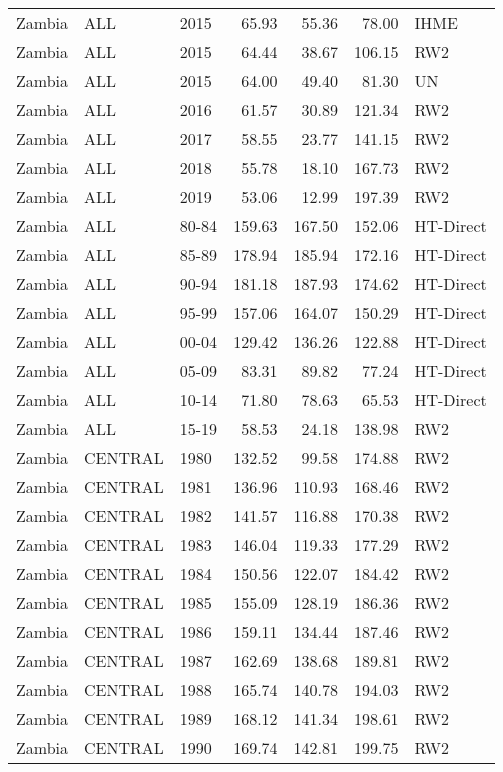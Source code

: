 \begin{longtable}{lllrrrl}
  Zambia & ALL & 2015 & 65.93 & 55.36 & 78.00 & IHME \\ 
  Zambia & ALL & 2015 & 64.44 & 38.67 & 106.15 & RW2 \\ 
  Zambia & ALL & 2015 & 64.00 & 49.40 & 81.30 & UN \\ 
  Zambia & ALL & 2016 & 61.57 & 30.89 & 121.34 & RW2 \\ 
  Zambia & ALL & 2017 & 58.55 & 23.77 & 141.15 & RW2 \\ 
  Zambia & ALL & 2018 & 55.78 & 18.10 & 167.73 & RW2 \\ 
  Zambia & ALL & 2019 & 53.06 & 12.99 & 197.39 & RW2 \\ 
  Zambia & ALL & 80-84 & 159.63 & 167.50 & 152.06 & HT-Direct \\ 
  Zambia & ALL & 85-89 & 178.94 & 185.94 & 172.16 & HT-Direct \\ 
  Zambia & ALL & 90-94 & 181.18 & 187.93 & 174.62 & HT-Direct \\ 
  Zambia & ALL & 95-99 & 157.06 & 164.07 & 150.29 & HT-Direct \\ 
  Zambia & ALL & 00-04 & 129.42 & 136.26 & 122.88 & HT-Direct \\ 
  Zambia & ALL & 05-09 & 83.31 & 89.82 & 77.24 & HT-Direct \\ 
  Zambia & ALL & 10-14 & 71.80 & 78.63 & 65.53 & HT-Direct \\ 
  Zambia & ALL & 15-19 & 58.53 & 24.18 & 138.98 & RW2 \\ 
  Zambia & CENTRAL & 1980 & 132.52 & 99.58 & 174.88 & RW2 \\ 
  Zambia & CENTRAL & 1981 & 136.96 & 110.93 & 168.46 & RW2 \\ 
  Zambia & CENTRAL & 1982 & 141.57 & 116.88 & 170.38 & RW2 \\ 
  Zambia & CENTRAL & 1983 & 146.04 & 119.33 & 177.29 & RW2 \\ 
  Zambia & CENTRAL & 1984 & 150.56 & 122.07 & 184.42 & RW2 \\ 
  Zambia & CENTRAL & 1985 & 155.09 & 128.19 & 186.36 & RW2 \\ 
  Zambia & CENTRAL & 1986 & 159.11 & 134.44 & 187.46 & RW2 \\ 
  Zambia & CENTRAL & 1987 & 162.69 & 138.68 & 189.81 & RW2 \\ 
  Zambia & CENTRAL & 1988 & 165.74 & 140.78 & 194.03 & RW2 \\ 
  Zambia & CENTRAL & 1989 & 168.12 & 141.34 & 198.61 & RW2 \\ 
  Zambia & CENTRAL & 1990 & 169.74 & 142.81 & 199.75 & RW2 \\ 

\end{longtable}
